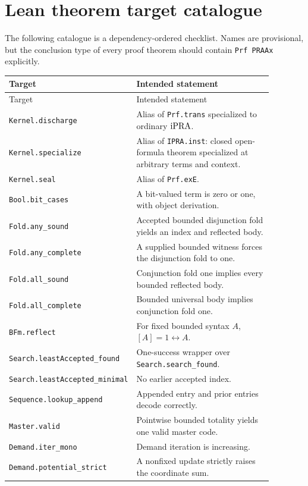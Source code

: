 \section{Lean theorem target catalogue}
\label{app:signatures}

The following catalogue is a dependency-ordered checklist.  Names are
provisional, but the conclusion type of every proof theorem should contain
\texttt{Prf PRAAx} explicitly.

\small
\begin{longtable}{Y{0.35\linewidth}Y{0.53\linewidth}}
\toprule
Target & Intended statement\\
\midrule
\endfirsthead
\toprule
Target & Intended statement\\
\midrule
\endhead
\texttt{Kernel.discharge} & Alias of \texttt{Prf.trans} specialized to ordinary \(\mathrm{iPRA}\).\\
\texttt{Kernel.specialize} & Alias of \texttt{IPRA.inst}: closed open-formula theorem specialized at arbitrary terms and context.\\
\texttt{Kernel.seal} & Alias of \texttt{Prf.exE}.\\
\texttt{Bool.bit\_cases} & A bit-valued term is zero or one, with object derivation.\\
\texttt{Fold.any\_sound} & Accepted bounded disjunction fold yields an index and reflected body.\\
\texttt{Fold.any\_complete} & A supplied bounded witness forces the disjunction fold to one.\\
\texttt{Fold.all\_sound} & Conjunction fold one implies every bounded reflected body.\\
\texttt{Fold.all\_complete} & Bounded universal body implies conjunction fold one.\\
\texttt{BFm.reflect} & For fixed bounded syntax \(A\), \([A]=1\leftrightarrow A\).\\
\texttt{Search.leastAccepted\_found} & One-success wrapper over \texttt{Search.search\_found}.\\
\texttt{Search.leastAccepted\_minimal} & No earlier accepted index.\\
\texttt{Sequence.lookup\_append} & Appended entry and prior entries decode correctly.\\
\texttt{Master.valid} & Pointwise bounded totality yields one valid master code.\\
\texttt{Demand.iter\_mono} & Demand iteration is increasing.\\
\texttt{Demand.potential\_strict} & A nonfixed update strictly raises the coordinate sum.\\

\end{longtable}
